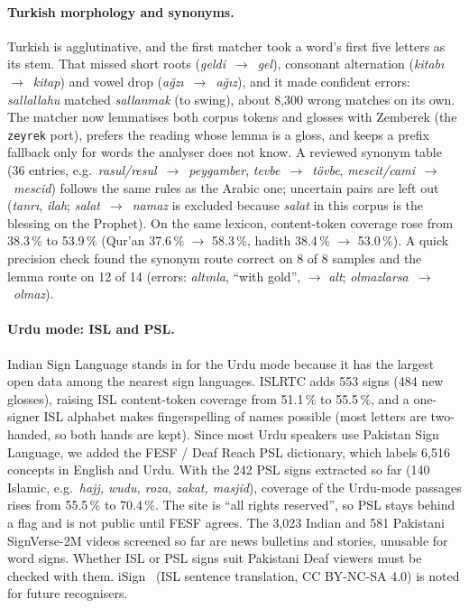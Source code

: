\paragraph{Turkish morphology and synonyms.} Turkish is agglutinative, and the first matcher took a word's first five letters
as its stem. That missed short roots (\textit{geldi}~$\to$~\textit{gel}), consonant alternation (\textit{kitab\i}~$\to$~\textit{kitap})
and vowel drop (\textit{a\u{g}z\i}~$\to$~\textit{a\u{g}\i z}), and it made confident errors: \textit{sallallahu} matched
\textit{sallanmak} (to swing), about 8,300 wrong matches on its own. The matcher now lemmatises both corpus tokens and glosses
with Zemberek (the \texttt{zeyrek} port), prefers the reading whose lemma is a gloss, and keeps a prefix fallback only for words
the analyser does not know. A reviewed synonym table (36 entries, e.g.\ \textit{rasul/resul}~$\to$~\textit{peygamber},
\textit{tevbe}~$\to$~\textit{t\"ovbe}, \textit{mescit/cami}~$\to$~\textit{mescid}) follows the same rules as the Arabic one; uncertain
pairs are left out (\textit{tanr\i}, \textit{ilah}; \textit{salat}~$\to$~\textit{namaz} is excluded because \textit{salat} in this
corpus is the blessing on the Prophet). On the same lexicon, content-token coverage rose from 38.3\,\% to 53.9\,\% (Qur'an 37.6\,\%
$\to$ 58.3\,\%, hadith 38.4\,\% $\to$ 53.0\,\%). A quick precision check found the synonym route correct on 8 of 8 samples and the
lemma route on 12 of 14 (errors: \textit{alt\i nla}, ``with gold'', $\to$ \textit{alt}; \textit{olmazlarsa}~$\to$~\textit{olmaz}).

\paragraph{Urdu mode: ISL and PSL.} Indian Sign Language stands in for the Urdu mode because it has the largest open data among the
nearest sign languages. ISLRTC adds 553 signs (484 new glosses), raising ISL content-token coverage from 51.1\,\% to 55.5\,\%, and
a one-signer ISL alphabet makes fingerspelling of names possible (most letters are two-handed, so both hands are kept). Since most Urdu
speakers use Pakistan Sign Language, we added the FESF / Deaf Reach PSL dictionary, which labels 6,516 concepts in English and
Urdu. With the 242 PSL signs extracted so far (140 Islamic, e.g.\ \textit{hajj, wudu, roza, zakat, masjid}), coverage of the Urdu-mode
passages rises from 55.5\,\% to 70.4\,\%. The site is ``all rights reserved'', so PSL stays behind a flag and is not public until
FESF agrees. The 3,023 Indian and 581 Pakistani SignVerse-2M videos screened so far are news bulletins and stories, unusable for word signs.
Whether ISL or PSL signs suit Pakistani Deaf viewers must be checked with them. iSign~\cite{isign} (ISL sentence translation, CC
BY-NC-SA 4.0) is noted for future recognisers.

